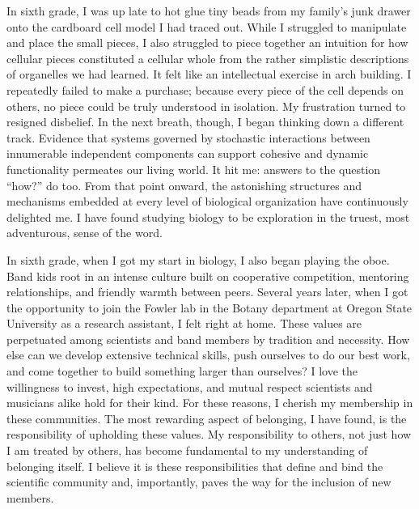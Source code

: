 
In sixth grade, I was up late to hot glue tiny beads from my family's junk drawer onto the cardboard cell model I had traced out.
While I struggled to manipulate and place the small pieces, I also struggled to piece together an intuition for how cellular pieces constituted a cellular whole from the rather simplistic descriptions of organelles we had learned.
It felt like an intellectual exercise in arch building.
I repeatedly failed to make a purchase;
because every piece of the cell depends on others, no piece could be truly understood in isolation.
My frustration turned to resigned disbelief.
In the next breath, though, I began thinking down a different track.
Evidence that systems governed by stochastic interactions between innumerable independent components can support cohesive and dynamic functionality permeates our living world.
It hit me: answers to the question ``how?'' do too.
From that point onward, the astonishing structures and mechanisms embedded at every level of biological organization have continuously delighted me.
I have found studying biology to be exploration in the truest, most adventurous, sense of the word.

In sixth grade, when I got my start in biology, I also began playing the oboe.
Band kids root in an intense culture built on cooperative competition, mentoring relationships, and friendly warmth between peers.
Several years later, when I got the opportunity to join the Fowler lab in the Botany department at Oregon State University as a research assistant, I felt right at home.
These values are perpetuated among scientists and band members by tradition and necessity.
How else can we develop extensive technical skills, push ourselves to do our best work, and come together to build something larger than ourselves?
I love the willingness to invest, high expectations, and mutual respect scientists and musicians alike hold for their kind.
For these reasons, I cherish my membership in these communities.
The most rewarding aspect of belonging, I have found, is the responsibility of upholding these values.
My responsibility to others, not just how I am treated by others, has become fundamental to my understanding of belonging itself.
I believe it is these responsibilities that define and bind the scientific community and, importantly, paves the way for the inclusion of new members.

